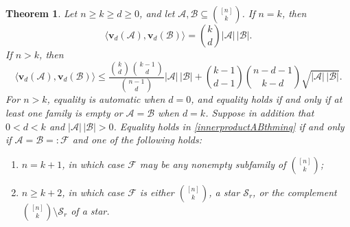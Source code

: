\documentclass[11pt]{article}
\numberwithin{equation}{section}
\newtheorem{theorem}{Theorem}[section]
\begin{document}
\begin{theorem}\label{innerproductABthm}
Let $n\geq k\geq d\geq0$, and let
$\mathcal{A},\mathcal{B}\subseteq\binom{[n]}{k}$.
If $n=k$, then
\begin{equation}\label{eq:innerproduct-n-equals-k}
\big\langle\mathbf{v}_d(\mathcal{A}),
\mathbf{v}_d(\mathcal{B})\big\rangle
=\binom kd|\mathcal{A}|\,|\mathcal{B}|.
\end{equation}
If $n>k$, then
\begin{equation}\label{innerproductABthminq}
\big\langle\mathbf{v}_d(\mathcal{A}),
\mathbf{v}_d(\mathcal{B})\big\rangle
\leq
\frac{\binom{k}{d}\binom{k-1}{d}}{\binom{n-1}{d}}
|\mathcal{A}|\,|\mathcal{B}| +\binom{k-1}{d-1}\binom{n-d-1}{k-d}
\sqrt{|\mathcal{A}|\,|\mathcal{B}|}.
\end{equation}
For $n>k$, equality is automatic when $d=0$,
and equality
holds if and only if at least one family is empty or
$\mathcal{A}=\mathcal{B}$ when $d=k$.
Suppose in addition that $0<d<k$ and
$|\mathcal{A}|\,|\mathcal{B}|>0$.
Equality holds in
\eqref{innerproductABthminq} if and only if
$\mathcal{A}=\mathcal{B}=:\mathcal{F}$ and one of the following holds:
\begin{enumerate}[label={\rm (\roman*)}]
\item $n=k+1$, in which case $\mathcal{F}$ may be any nonempty
subfamily of $\binom{[n]}{k}$;
\item $n\geq k+2$, in which case $\mathcal{F}$ is either
$\binom{[n]}{k}$, a star $\mathcal{S}_r$, or the complement
$\binom{[n]}{k}\setminus\mathcal{S}_r$ of a star.
\end{enumerate}
\end{theorem}
\end{document}
